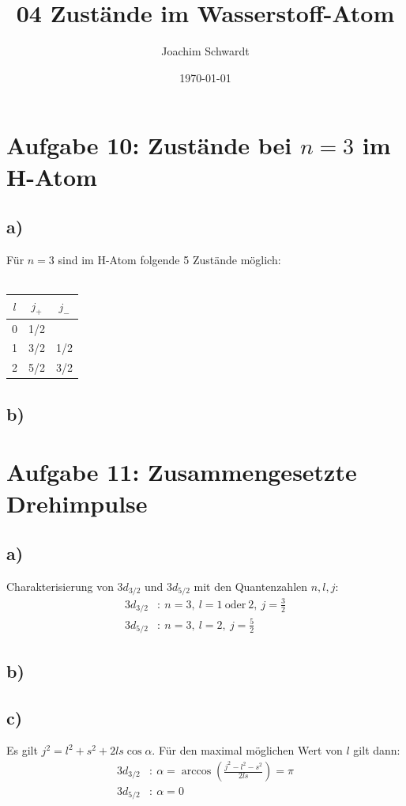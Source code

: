 \documentclass[a4paper,12pt]{article}
\newcommand{\kla}{}
\begin{document}
\title{04 Zustände im Wasserstoff-Atom}
\author{Joachim Schwardt}
\date{\today}
\maketitle

\section*{Aufgabe 10: Zustände bei $n=3$ im H-Atom}
\subsection*{a) }
Für $n=3$ sind im H-Atom folgende 5 Zustände möglich:\\ \\
\begin{tabular}{c|c|c}
$l$&$j_+$&$j_-$ \\ \hline
0 & 1/2 &   \\ \hline
1 & 3/2 & 1/2 \\ \hline
2 & 5/2 & 3/2
\end{tabular}
\subsection*{b) }
\section*{Aufgabe 11: Zusammengesetzte Drehimpulse}
\subsection*{a) }
Charakterisierung von $3d_{3/2}$ und $3d_{5/2}$ mit den Quantenzahlen $n,l,j$:
\begin{align*}
3d_{3/2}&:\ n=3,\ l=1\ \mathrm{oder}\ 2,\ j=\frac{3}{2}\\
3d_{5/2}&:\ n=3,\ l=2,\ j=\frac{5}{2}
\end{align*}
\subsection*{b) }
\subsection*{c) }
Es gilt $j^2=l^2+s^2+2ls\cos\alpha$. Für den maximal möglichen Wert von $l$ gilt dann:
\begin{align*}
3d_{3/2}&:\ \alpha = \arccos\kla\left( {\frac{j^2-l^2-s^2}{2ls}} \right)=\pi \\
3d_{5/2}&:\ \alpha= 0
\end{align*}
\end{document}
